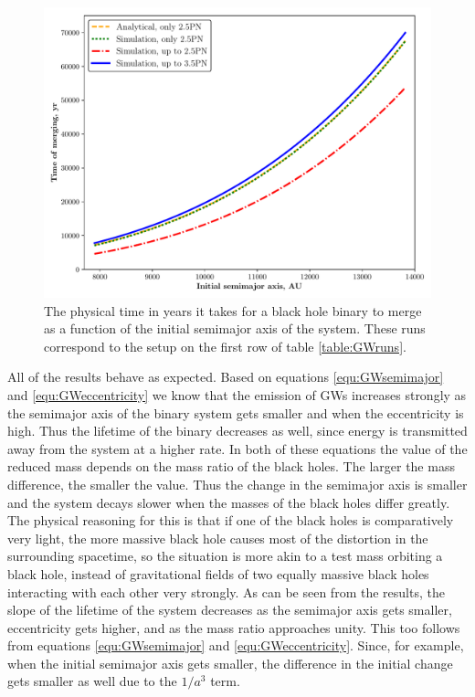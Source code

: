 \documentclass[english, oneside]{HYgradu}
\begin{document}
\begin{figure}[h!tb]
\centering
\includegraphics[scale=0.6]{../images/bh-merge-semi.pdf}
\caption{The physical time in years it takes for a black hole binary to merge as a function of the initial semimajor axis of the system. These runs correspond to the setup on the first row of table \ref{table:GWruns}.}
\label{fig:bh-merge-semi}
\end{figure}


All of the results behave as expected. Based on equations \eqref{equ:GWsemimajor} and \eqref{equ:GWeccentricity} we know that the emission of GWs increases strongly as the semimajor axis of the binary system gets smaller and when the eccentricity is high. Thus the lifetime of the binary decreases as well, since energy is transmitted away from the system at a higher rate.
In both of these equations the value of the reduced mass depends on the mass ratio of the black holes. The larger the mass difference, the smaller the value. Thus the change in the semimajor axis is smaller and the system decays slower when the masses of the black holes differ greatly. The physical reasoning for this is that if one of the black holes is comparatively very light, the more massive black hole causes most of the distortion in the surrounding spacetime, so the situation is more akin to a test mass orbiting a black hole, instead of gravitational fields of two equally massive black holes interacting with each other very strongly.
As can be seen from the results, the slope of the lifetime of the system decreases as the semimajor axis gets smaller, eccentricity gets higher, and as the mass ratio approaches unity. This too follows from equations \eqref{equ:GWsemimajor} and \eqref{equ:GWeccentricity}. Since, for example, when the initial semimajor axis gets smaller, the difference in the initial change gets smaller as well due to the $1/a^3$ term.
\end{document}
